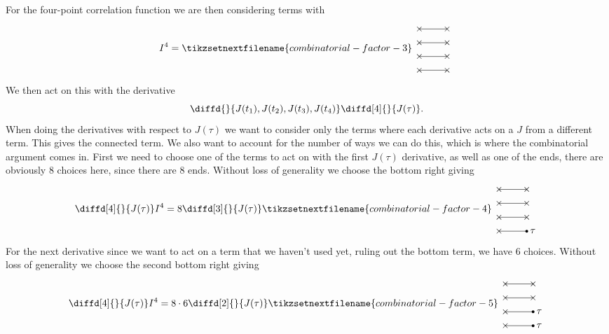         For the four-point correlation function we are then considering terms with
        \begin{equation}
            I^4 = 
            \tikzsetnextfilename{combinatorial-factor-3}
            \begin{tikzpicture}[baseline=0.7cm]
                \foreach \y in {0, 0.5, 1, 1.5} {
                    \draw (0, \y) -- (1, \y);
                    \node at (0, \y) {\(\times\)};
                    \node at (1, \y) {\(\times\)};
                }
            \end{tikzpicture}
        \end{equation}
        We then act on this with the derivative
        \begin{equation}
            \diffd{}{J(t_1),J(t_2),J(t_3),J(t_4)} \diffd[4]{}{J(\tau)}.
        \end{equation}
        When doing the derivatives with respect to \(J(\tau)\) we want to consider only the terms where each derivative acts on a \(J\) from a different term.
        This gives the connected term.
        We also want to account for the number of ways we can do this, which is where the combinatorial argument comes in.
        First we need to choose one of the terms to act on with the first \(J(\tau)\) derivative, as well as one of the ends, there are obviously \(8\) choices here, since there are 8 ends.
        Without loss of generality we choose the bottom right giving
        \begin{equation}
            \diffd[4]{}{J(\tau)} I^4 = 8\diffd[3]{}{J(\tau)}
            \tikzsetnextfilename{combinatorial-factor-4}
            \begin{tikzpicture}[baseline=0.7cm]
                \foreach \y in {0, 0.5, 1, 1.5} {
                    \draw (0, \y) -- (1, \y);
                    \node at (0, \y) {\(\times\)};
                }
                \fill (1, 0) circle [radius = 0.05] node[right] {\(\tau\)};
                \foreach \y in {0.5, 1, 1.5} {\node at (1, \y) {\(\times\)};}
            \end{tikzpicture}
        \end{equation}
        For the next derivative since we want to act on a term that we haven't used yet, ruling out the bottom term, we have \(6\) choices.
        Without loss of generality we choose the second bottom right giving
        \begin{equation}
            \diffd[4]{}{J(\tau)} I^4 = 8 \cdot 6 \diffd[2]{}{J(\tau)}
            \tikzsetnextfilename{combinatorial-factor-5}
            \begin{tikzpicture}[baseline=0.7cm]
                \foreach \y in {0, 0.5, 1, 1.5} {
                    \draw (0, \y) -- (1, \y);
                    \node at (0, \y) {\(\times\)};
                }
                \fill (1, 0) circle [radius = 0.05] node[right] {\(\tau\)};
                \fill (1, 0.5) circle [radius = 0.05] node[right] {\(\tau\)};
                \foreach \y in {1, 1.5} {\node at (1, \y) {\(\times\)};}
            \end{tikzpicture}
        \end{equation}
